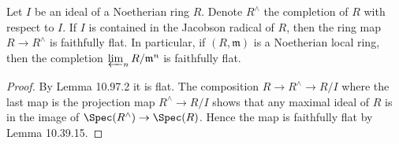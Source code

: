 \begin{lemma}[10.97.3]
Let $I$ be an ideal of a Noetherian ring $R$. Denote $R^\wedge$ the completion of $R$ with respect to $I$. If $I$ is contained in the Jacobson radical of $R$, then the ring map $R\to R^\wedge$ is faithfully flat. In particular, if $(R,\mathfrak m)$ is a Noetherian local ring, then the completion $\varprojlim_nR/\mathfrak m^n$ is faithfully flat.
\end{lemma}
\begin{proof}
By Lemma 10.97.2 it is flat. The composition $R\to R^\wedge\to R/I$ where the last map is the projection map $R^\wedge\to R/I$ shows that any maximal ideal of $R$ is in the image of $\Spec(R^\wedge)\to\Spec(R)$. Hence the map is faithfully flat by Lemma 10.39.15.
\end{proof}

